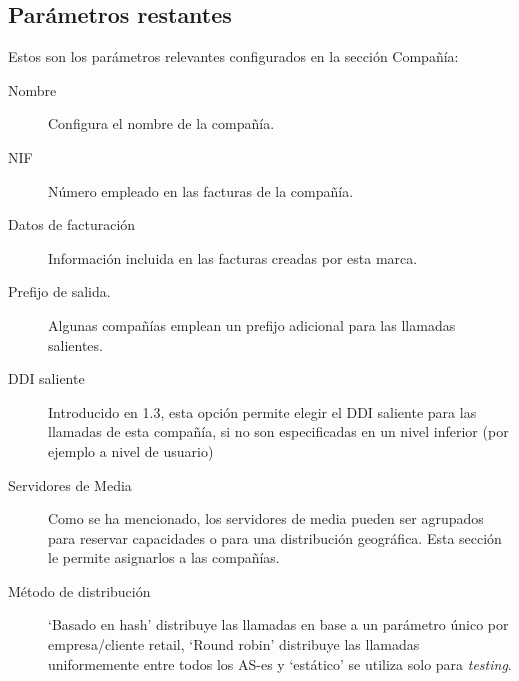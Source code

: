 \documentclass[letterpaper,10pt,spanish]{sphinxmanual}
\begin{document}
\subsection{Parámetros restantes}
\label{internal_calls/brand_portal:remaining-parameters}
Estos son los parámetros relevantes configurados en la sección Compañía:
\begin{description}
\item[{Nombre}] \leavevmode{}\label{internal_calls/brand_portal:term-name}
Configura el nombre de la compañía.

\item[{NIF}] \leavevmode{}\label{internal_calls/brand_portal:term-nif}
Número empleado en las facturas de la compañía.

\item[{Datos de facturación}] \leavevmode{}\label{internal_calls/brand_portal:term-invoice-data}
Información incluida en las facturas creadas por esta marca.

\item[{Prefijo de salida.}] \leavevmode{}\label{internal_calls/brand_portal:term-outbound-prefix}
Algunas compañías emplean un prefijo adicional para las llamadas salientes.

\item[{DDI saliente}] \leavevmode{}\label{internal_calls/brand_portal:term-outgoing-ddi}
Introducido en 1.3, esta opción permite elegir el DDI saliente para las llamadas de esta compañía, si no son especificadas en un nivel inferior (por ejemplo a nivel de usuario)

\item[{Servidores de Media}] \leavevmode{}\label{internal_calls/brand_portal:term-media-relay-set}
Como se ha mencionado, los servidores de media pueden ser agrupados para reservar capacidades o para una distribución geográfica. Esta sección le permite asignarlos a las compañías.

\item[{Método de distribución}] \leavevmode{}\label{internal_calls/brand_portal:term-distribute-method}
`Basado en hash' distribuye las llamadas en base a un parámetro único por empresa/cliente retail, `Round robin' distribuye las llamadas uniformemente entre todos los AS-es y `estático' se utiliza solo para \emph{testing}.


\end{description}
\end{document}
